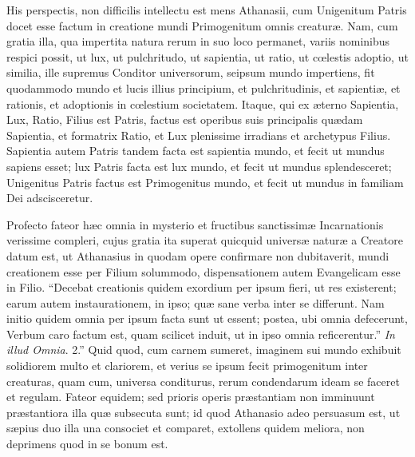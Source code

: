 His
perspectis, non difficilis intellectu est mens Athanasii, cum
Unigenitum Patris docet esse factum in creatione mundi Primogenitum
omnis creaturæ. Nam, cum gratia illa, qua impertita natura rerum in
suo loco permanet, variis nominibus respici possit, ut lux, ut
pulchritudo, ut sapientia, ut ratio, ut cœlestis adoptio, ut similia,
ille supremus Conditor universorum, seipsum mundo impertiens, fit
quodammodo mundo et lucis illius principium, et pulchritudinis, et
sapientiæ, et rationis, et adoptionis in cœlestium societatem.
Itaque, qui ex æterno Sapientia, Lux, Ratio, Filius est Patris,
factus est operibus suis principalis quædam Sapientia, et formatrix
Ratio, et Lux plenissime irradians et archetypus Filius. Sapientia autem Patris tandem facta est sapientia mundo, et fecit ut
mundus sapiens esset; lux Patris facta est lux mundo, et fecit ut
mundus splendesceret; Unigenitus Patris factus est Primogenitus mundo,
et fecit ut mundus in familiam Dei adscisceretur.

Profecto
fateor hæc omnia in mysterio et fructibus sanctissimæ Incarnationis
verissime compleri, cujus gratia ita superat quicquid universæ naturæ
a Creatore datum est, ut Athanasius in quodam opere confirmare non
dubitaverit, mundi creationem esse per Filium solummodo,
dispensationem autem Evangelicam esse in Filio. ``Decebat creationis
quidem exordium per ipsum fieri, ut res existerent; earum autem
instaurationem, in ipso; quæ sane verba inter se differunt. Nam
initio quidem omnia per ipsum facta sunt ut essent; postea, ubi omnia
defecerunt, Verbum caro factum est, quam scilicet induit, ut in ipso
omnia reficerentur.'' \emph{In illud Omnia}. 2.'' Quid quod, cum carnem
sumeret, imaginem sui mundo exhibuit solidiorem multo et clariorem, et
verius se ipsum fecit primogenitum inter creaturas, quam cum, universa
conditurus, rerum condendarum ideam se faceret et regulam. Fateor
equidem; sed prioris operis præstantiam non imminuunt præstantiora
illa quæ subsecuta sunt; id quod Athanasio adeo persuasum est, ut sæpius
duo illa una consociet et comparet, extollens quidem meliora, non
deprimens quod in se bonum est.

